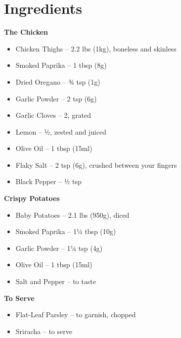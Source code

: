 




\section*{Ingredients}

\textbf{The Chicken}
\begin{itemize}[itemsep=0.1em, label={\raisebox{-0.1ex}{\large\textbullet}}]
      \item Chicken Thighs – 2.2 lbs (1kg), boneless and skinless
      \item[\measure] Smoked Paprika – 1 tbsp (8g)
      \item[\measure] Dried Oregano – ¾ tsp (1g)
      \item[\measure] Garlic Powder – 2 tsp (6g)
      \item[\cut] Garlic Cloves – 2, grated
      \item[\cut] Lemon – ½, zested and juiced
      \item[\measure] Olive Oil – 1 tbsp (15ml)
      \item[\measure] Flaky Salt – 2 tsp (6g), crushed between your fingers
      \item[\measure] Black Pepper – ½ tsp
\end{itemize}

\textbf{Crispy Potatoes}
\begin{itemize}[itemsep=0.1em, label={\raisebox{-0.1ex}{\large\textbullet}}]
      \item[\cut] Baby Potatoes – 2.1 lbs (950g), diced
      \item[\measure] Smoked Paprika – 1¼ tbsp (10g)
      \item[\measure] Garlic Powder – 1¼ tsp (4g)
      \item[\measure] Olive Oil – 1 tbsp (15ml)
      \item Salt and Pepper – to taste
\end{itemize}

\textbf{To Serve}
\begin{itemize}[itemsep=0.1em, label={\raisebox{-0.1ex}{\large\textbullet}}]
      \item[\cut] Flat-Leaf Parsley – to garnish, chopped
      \item Sriracha – to serve
\end{itemize}

